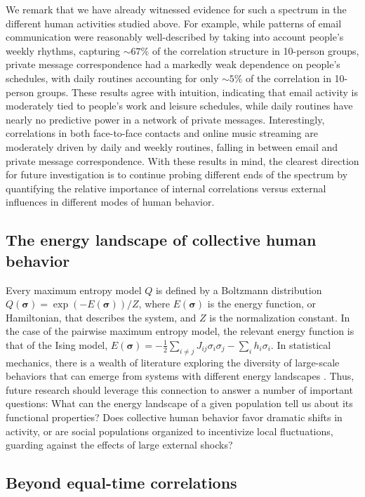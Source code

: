 \documentclass[aps,reprint,superscriptaddress,amsmath,amssymb,longbibliography]{revtex4-1}
\begin{document}
We remark that we have already witnessed evidence for such a spectrum in the different human activities studied above. For example, while patterns of email communication were reasonably well-described by taking into account people's weekly rhythms, capturing $\sim 67\%$ of the correlation structure in 10-person groups, private message correspondence had a markedly weak dependence on people's schedules, with daily routines accounting for only $\sim 5\%$ of the correlation in 10-person groups. These results agree with intuition, indicating that email activity is moderately tied to people's work and leisure schedules, while daily routines have nearly no predictive power in a network of private messages. Interestingly, correlations in both face-to-face contacts and online music streaming are moderately driven by daily and weekly routines, falling in between email and private message correspondence. With these results in mind, the clearest direction for future investigation is to continue probing different ends of the spectrum by quantifying the relative importance of internal correlations versus external influences in different modes of human behavior.

\subsection{The energy landscape of collective human behavior}

Every maximum entropy model $Q$ is defined by a Boltzmann distribution $Q(\bm{\sigma}) = \exp(-E(\bm{\sigma}))/Z$, where $E(\bm{\sigma})$ is the energy function, or Hamiltonian, that describes the system, and $Z$ is the normalization constant. In the case of the pairwise maximum entropy model, the relevant energy function is that of the Ising model, $E(\bm{\sigma}) = -\frac{1}{2}\sum_{i\neq j}J_{ij}\sigma_i\sigma_j - \sum_i h_i\sigma_i$. In statistical mechanics, there is a wealth of literature exploring the diversity of large-scale behaviors that can emerge from systems with different energy landscapes \cite{Chandler-01,Jaynes-01}. Thus, future research should leverage this connection to answer a number of important questions: What can the energy landscape of a given population tell us about its functional properties? Does collective human behavior favor dramatic shifts in activity, or are social populations organized to incentivize local fluctuations, guarding against the effects of large external shocks?

\subsection{Beyond equal-time correlations}
\end{document}
